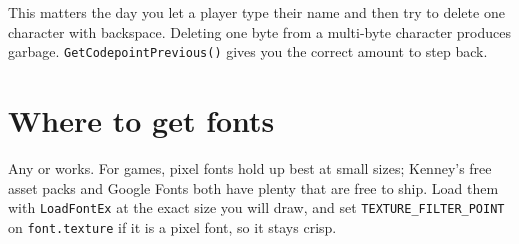 This matters the day you let a player type their name and then try to delete one
character with backspace. Deleting one byte from a multi-byte character produces
garbage. \lstinline|GetCodepointPrevious()| gives you the correct amount to step
back.

\section{Where to get fonts}

Any  or  works. For games, pixel fonts hold up best at
small sizes; Kenney's free asset packs and Google Fonts both have plenty that are
free to ship. Load them with \lstinline|LoadFontEx| at the exact size you will
draw, and set \lstinline|TEXTURE_FILTER_POINT| on \lstinline|font.texture| if it
is a pixel font, so it stays crisp.

